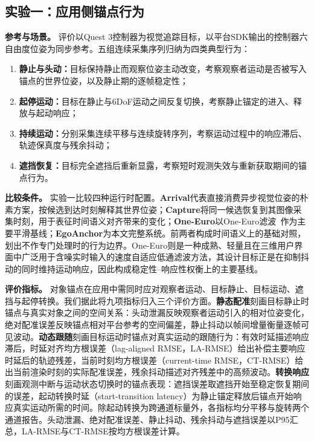 \documentclass[review]{vgtc}
\begin{document}
\subsection{实验一：应用侧锚点行为}\label{sec:exp1-design}

\textbf{参考与场景。}
评价以Quest 3控制器为视觉追踪目标，以平台SDK输出的控制器六自由度位姿为同步参考。五组连续采集序列归纳为四类典型行为：
\begin{enumerate}
  \item \textbf{静止与头动：}目标保持静止而观察位姿主动改变，考察观察者运动是否被写入锚点的世界位姿，以及静止期的逐帧稳定性；
  \item \textbf{起停运动：}目标在静止与6DoF运动之间反复切换，考察静止锚定的进入、释放与起动响应；
  \item \textbf{持续运动：}分别采集连续平移与连续旋转序列，考察运动过程中的响应滞后、轨迹保真度与残余抖动；
  \item \textbf{遮挡恢复：}目标完全遮挡后重新显露，考察短时观测失效与重新获取期间的锚点行为。
\end{enumerate}

\textbf{比较条件。}
实验一比较四种运行时配置。\textbf{Arrival}代表直接消费异步视觉位姿的朴素方案，按候选到达时刻解释其世界位姿；\textbf{Capture}将同一候选恢复到其图像采集时刻，用于表征时间语义对齐带来的变化；\textbf{One-Euro}以One-Euro滤波~\cite{casiez2012oneeuro}作为主要平滑基线；\textbf{EgoAnchor}为本文完整系统。前两者构成时间语义上的基础对照，划出不作专门处理时的行为边界。One-Euro则是一种成熟、轻量且在三维用户界面中广泛用于含噪实时输入的速度自适应低通滤波方法，其设计目标正是在抑制抖动的同时维持运动响应，因此构成稳定性--响应性权衡上的主要基线。


\textbf{评价指标。}
对象锚点在应用中需同时应对观察者运动、目标静止、目标运动、遮挡与起停转换。我们据此将九项指标归入三个评价方面。\textbf{静态配准}刻画目标静止时锚点与真实对象之间的空间关系：头动泄漏反映观察者运动引入的相对位姿变化，绝对配准误差反映锚点相对平台参考的空间偏差，静止抖动以帧间增量衡量逐帧可见波动。\textbf{动态跟随}刻画目标运动时锚点对真实运动的跟随行为：有效时延描述响应滞后，时延对齐均方根误差（lag-aligned RMSE，LA-RMSE）给出补偿主要响应时延后的轨迹残差，当前时刻均方根误差（current-time RMSE，CT-RMSE）给出当前渲染时刻的实际配准误差，残余抖动描述对齐残差中的高频波动。\textbf{转换响应}刻画观测中断与运动状态切换时的锚点表现：遮挡误差取遮挡开始至稳定恢复期间的误差，起动转换时延（start-transition latency）为静止锚定释放后锚点开始响应真实运动所需的时间。除起动转换为跨通道标量外，各指标均分平移与旋转两个通道报告。头动泄漏、绝对配准误差、静止抖动、残余抖动与遮挡误差以P95汇总，LA-RMSE与CT-RMSE按均方根误差计算。
\end{document}
